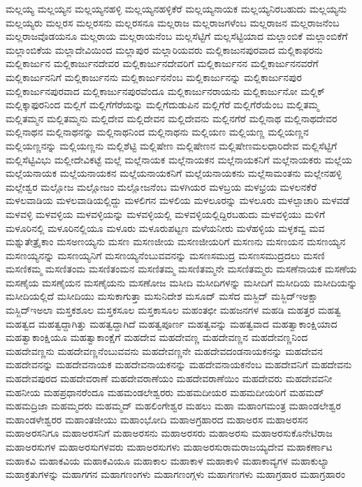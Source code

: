 {ಮಲ್ಲಯ್ಯ
ಮಲ್ಲಯ್ಯನ
ಮಲ್ಲಯ್ಯನಹಳ್ಳಿ
ಮಲ್ಲಯ್ಯನಹಳ್ಳಿಕೆರೆ
ಮಲ್ಲಯ್ಯನಾಯಕ
ಮಲ್ಲಯ್ಯನಿರಬಹುದು
ಮಲ್ಲಯ್ಯನು
ಮಲ್ಲಯ್ಯರು
ಮಲ್ಲರಸ
ಮಲ್ಲರಸನು
ಮಲ್ಲರಸನೂ
ಮಲ್ಲರಾಜ
ಮಲ್ಲರಾಜಗಳೆಂಬ
ಮಲ್ಲರಾಜನ
ಮಲ್ಲರಾಜನೆಂಬ
ಮಲ್ಲರಾಜವೊಡಯನೂ
ಮಲ್ಲರಾಯ
ಮಲ್ಲರಾಯನೆಂಬ
ಮಲ್ಲಸೆಟ್ಟಿಗೆ
ಮಲ್ಲಸೆಟ್ಟಿಯಾದ
ಮಲ್ಲಾಂಬಿಕೆ
ಮಲ್ಲಾಂಬಿಕೆಗೆ
ಮಲ್ಲಾಂಬಿಕೆಯ
ಮಲ್ಲಾದೇವಿಯಿಂದ
ಮಲ್ಲಾಪುರ
ಮಲ್ಲಾರಿಯವರು
ಮಲ್ಲಿಕಾಜುನಪುರವಾದ
ಮಲ್ಲಿಕಾಫರನು
ಮಲ್ಲಿಕಾರ್ಜುನ
ಮಲ್ಲಿಕಾರ್ಜುನದೇವರ
ಮಲ್ಲಿಕಾರ್ಜುನದೇವರಿಗೆ
ಮಲ್ಲಿಕಾರ್ಜುನನ
ಮಲ್ಲಿಕಾರ್ಜುನನವರೆಗೆ
ಮಲ್ಲಿಕಾರ್ಜುನನಿಗೆ
ಮಲ್ಲಿಕಾರ್ಜುನನು
ಮಲ್ಲಿಕಾರ್ಜುನನೆಂಬ
ಮಲ್ಲಿಕಾರ್ಜುನನ್ನು
ಮಲ್ಲಿಕಾರ್ಜುನಪುರ
ಮಲ್ಲಿಕಾರ್ಜುನಪುರವಾದ
ಮಲ್ಲಿಕಾರ್ಜುನಪುರವೆಂದೂ
ಮಲ್ಲಿಕಾರ್ಜುನರಾಯನು
ಮಲ್ಲಿಕಾರ್ಜುನೋ
ಮಲ್ಲಿಕ್
ಮಲ್ಲಿಕ್ಕಾಫುರನಿಂದ
ಮಲ್ಲಿಗೆ
ಮಲ್ಲಿಗೆಗೆರೆಯನ್ನು
ಮಲ್ಲಿಗೆದುಡುಪಿನ
ಮಲ್ಲಿಗೆರೆ
ಮಲ್ಲಿಗೆರೆಯೆಂಬ
ಮಲ್ಲಿತಮ್ಮ
ಮಲ್ಲಿತಮ್ಮನ
ಮಲ್ಲಿತಮ್ಮನು
ಮಲ್ಲಿದೇವ
ಮಲ್ಲಿದೇವನ
ಮಲ್ಲಿದೇವನು
ಮಲ್ಲಿನಗೆರೆ
ಮಲ್ಲಿನಾಥ
ಮಲ್ಲಿನಾಥದೇವರ
ಮಲ್ಲಿನಾಥನ
ಮಲ್ಲಿನಾಥನನ್ನು
ಮಲ್ಲಿನಾಥನಿಂದ
ಮಲ್ಲಿನಾಥನು
ಮಲ್ಲಿಯಣ
ಮಲ್ಲಿಯಣ್ಣ
ಮಲ್ಲಿಯಣ್ಣನ
ಮಲ್ಲಿಯಣ್ಣನನ್ನು
ಮಲ್ಲಿಯಣ್ಣನು
ಮಲ್ಲಿಶೆಟ್ಟಿ
ಮಲ್ಲಿಷೇಣ
ಮಲ್ಲಿಷೇಣನ
ಮಲ್ಲಿಷೇಣಮಲಧಾರಿದೇವ
ಮಲ್ಲಿಸೆಟ್ಟಿಗೆ
ಮಲ್ಲಿಸೆಟ್ಟಿವಿಭು
ಮಲ್ಲೀದೇವಿಕಟ್ಟೆ
ಮಲ್ಲೆ
ಮಲ್ಲೆನಾಯಕ
ಮಲ್ಲೆನಾಯಕನ
ಮಲ್ಲೆನಾಯಕನಿಗೆ
ಮಲ್ಲೆನಾಯಕರು
ಮಲ್ಲೆಯ
ಮಲ್ಲೆಯನಾಯಕ
ಮಲ್ಲೆಯನಾಯಕನ
ಮಲ್ಲೆಯನಾಯಕನಿಗೆ
ಮಲ್ಲೆಯನಾಯಕನು
ಮಲ್ಲೆಸಾಮಂತನು
ಮಲ್ಲೇನಹಳ್ಳಿ
ಮಲ್ಲೇಶ್ವರ
ಮಲ್ಲೋಜ
ಮಲ್ಲೋಜಂ
ಮಲ್ಲೋಜನೆಂಬ
ಮಳಗಿಯರ
ಮಳಬ್ರಯ
ಮಳಭ್ರಯ
ಮಳಲನಕೆರೆ
ಮಳಲವಾಡಿಯ
ಮಳಲವಾಡಿಯಲ್ಲಿದ್ದು
ಮಳಲಿಗನ
ಮಳಲಿಯ
ಮಳಲೂರನ್ನು
ಮಳಲೂರು
ಮಳಲ್ಪಾಚಾರಿ
ಮಳವಡೆ
ಮಳವಳ್ಳಿ
ಮಳವಳ್ಳಿಯ
ಮಳವಳ್ಳಿಯನ್ನು
ಮಳವಳ್ಳಿಯಲ್ಲಿ
ಮಳವಳ್ಳಿಯಲ್ಲಿದ್ದಿರಬಹುದು
ಮಳವಳ್ಳಿಯು
ಮಳಿಗೆ
ಮಳೂರಿನಲ್ಲಿ
ಮಳೂರಿನಲ್ಲಿಯೂ
ಮಳೂರು
ಮಳೂರುಪಟ್ಟಣ
ಮಳೆಯನೀರು
ಮಳೆಹಳ್ಳಿಯ
ಮಳ್ಳಕವ್ವ
ಮವ
ಮಶ್ನುತೇತ್ರೈಕಾಂ
ಮಸಅಣಯ್ಯನು
ಮಸಣ
ಮಸಣಜೀಯ
ಮಸಣಜೀಯರಿಗೆ
ಮಸಣನು
ಮಸಣಯನ
ಮಸಣಯ್ಯನ
ಮಸಣಯ್ಯನನ್ನು
ಮಸಣಯ್ಯನಿಗೆ
ಮಸಣಯ್ಯನೆಂಬುವವನನ್ನು
ಮಸಣಸಮುದ್ರ
ಮಸಣಸಮುದ್ರದಲು
ಮಸಣಿ
ಮಸಣಿಕಮ್ಮ
ಮಸಣಿತಂಮ
ಮಸಣಿತಂಮನ
ಮಸಣಿತಮ್ಮ
ಮಸಣಿತಮ್ಮನೇ
ಮಸಣಿತಮ್ಮರು
ಮಸಣೆನಾಯಕ
ಮಸಣೆಯ
ಮಸಣೈಯ
ಮಸಣೈಯನ
ಮಸಣೈಯನು
ಮಸಣೋಜ
ಮಸೀದಿ
ಮಸೀದಿಗಳನ್ನು
ಮಸೀದಿಗೆ
ಮಸೀದಿಯ
ಮಸೀದಿಯನ್ನು
ಮಸೀದಿಯಲ್ಲಿದೆ
ಮಸೀದಿಯು
ಮಸುಕಾಗುತ್ತಾ
ಮಸುನಿದೇಶ
ಮಸೂದ್
ಮಸೆದ
ಮಸ್ಜಿದ್
ಮಸ್ಜಿದ್ಇಅಕ್ಷಾ
ಮಸ್ಜಿದ್ಇಅಲಾ
ಮಸ್ತಕಶೂಲ
ಮಸ್ತಕಸೂಲ
ಮಸ್ತಕಾಸೂಲ
ಮಹಂತಛೀ
ಮಹಜನಗಳ
ಮಹಡಿ
ಮಹತ್ತರ
ಮಹತ್ವ
ಮಹತ್ವದ
ಮಹತ್ವದ್ದಾಗಿತ್ತು
ಮಹತ್ವದ್ದಾಗಿದೆ
ಮಹತ್ವಪೂರ್ಣ
ಮಹತ್ವವನ್ನು
ಮಹತ್ವವಾದ
ಮಹತ್ವಾಕಾಂಕ್ಷಿಯಾದ
ಮಹತ್ವಾಕಾಂಕ್ಷಿಯೂ
ಮಹತ್ವಾಕಾಂಕ್ಷೆಗೆ
ಮಹದೇವ
ಮಹದೇವಣ್ಣ
ಮಹದೇವಣ್ಣನ
ಮಹದೇವಣ್ಣನಿಂದ
ಮಹದೇವಣ್ಣನು
ಮಹದೇವಣ್ಣನೆಂಬುವವನು
ಮಹದೇವಣ್ಣನೇ
ಮಹದೇವದಂಡನಾಯಕನನ್ನು
ಮಹದೇವನ
ಮಹದೇವನನ್ನು
ಮಹದೇವನಾಯಕ
ಮಹದೇವನಾಯಕನನ್ನು
ಮಹದೇವನಾಯಕನೆಂಬ
ಮಹದೇವನಿಗೆ
ಮಹದೇವನು
ಮಹದೇವಪುರದ
ಮಹದೇವರಾಣೆ
ಮಹದೇವರಾಣೆಯಂ
ಮಹದೇವರಾಣೆಯಿಂ
ಮಹದೇವರು
ಮಹದೇವವನೀ
ಮಹನೀಯ
ಮಹಪ್ರಧಾನರೆಂದೂ
ಮಹಮಂಡಲೇಶ್ವರರು
ಮಹಮದೀಯರ
ಮಹಮದೀಯರಿಗೆ
ಮಹಮದ್
ಮಹಮದ್ರಿಜಾ
ಮಹಮ್ಮದರು
ಮಹಮ್ಮದ್
ಮಹಲಿಂಗೇಶ್ವರ
ಮಹಲು
ಮಹಾ
ಮಹಾಂಗಮಂತ್ರ
ಮಹಾಂಡಲೇಶ್ವರ
ಮಹಾಂಡಳೇಶ್ವರರ
ಮಹಾಂತಜೀಯು
ಮಹಾಂಭೋದಿ
ಮಹಾಅಗ್ರಹಾರದ
ಮಹಾಅರಸ
ಮಹಾಅರಸನ
ಮಹಾಅರಸನಿಗೂ
ಮಹಾಅರಸನಿಗೆ
ಮಹಾಅರಸನು
ಮಹಾಅರಸರು
ಮಹಾಅರಸು
ಮಹಾಅರಸುಕೊನೇಟಿರಾಜ
ಮಹಾಅರಸುಗಳ
ಮಹಾಅರಸುಗಳವರು
ಮಹಾಅರಸುಗಳು
ಮಹಾಅರಸುರಾಮರಾಜಯ್ಯದೇವ
ಮಹಾಕರ್ಣಾಟ
ಮಹಾಕವಿ
ಮಹಾಕವಿಯ
ಮಹಾಕವಿಯೂ
ಮಹಾಕಾಲ
ಮಹಾಕಾಳ
ಮಹಾಕಾಳಿ
ಮಹಾಕಾವ್ಯಗಳ
ಮಹಾಕುಲ್ಯಾ
ಮಹಾಕ್ರತುಗಳನ್ನು
ಮಹಾಗಗನ
ಮಹಾಗಣಂಗಳು
ಮಹಾಗಣಂಗ್ಗಳು
ಮಹಾಗಣಗಳು
ಮಹಾಗ್ರಹಾರ
ಮಹಾಗ್ರಹಾರಂ
}
